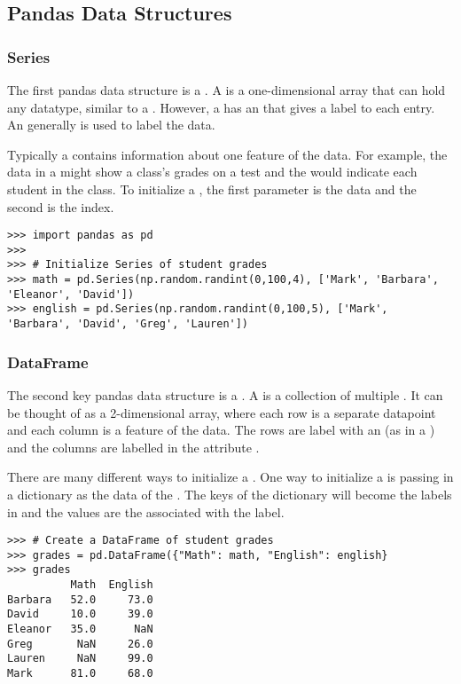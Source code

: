 \subsection*{Pandas Data Structures}

\subsubsection*{Series}

The first pandas data structure is a .
A  is a one-dimensional array that can hold any datatype, similar to a .
However, a  has an  that gives a label to each entry.
An  generally is used to label the data.

Typically a  contains information about one feature of the data.
For example, the data in a  might show a class's grades on a test and the  would indicate each student in the class.
To initialize a , the first parameter is the data and the second is the index.

\begin{lstlisting}
>>> import pandas as pd
>>>
>>> # Initialize Series of student grades
>>> math = pd.Series(np.random.randint(0,100,4), ['Mark', 'Barbara', 'Eleanor', 'David'])
>>> english = pd.Series(np.random.randint(0,100,5), ['Mark', 'Barbara', 'David', 'Greg', 'Lauren'])
\end{lstlisting}

\subsubsection*{DataFrame}

The second key pandas data structure is a .
A  is a collection of multiple .
It can be thought of as a 2-dimensional array, where each row is a separate datapoint and each column is a feature of the data.
The rows are label with an  (as in a ) and the columns are labelled in the attribute .

There are many different ways to initialize a .
One way to initialize a  is passing in a dictionary as the data of the .
The keys of the dictionary will become the labels in  and the values are the  associated with the label.

\begin{lstlisting}
>>> # Create a DataFrame of student grades
>>> grades = pd.DataFrame({"Math": math, "English": english}
>>> grades
	      Math  English
Barbara   52.0     73.0
David     10.0     39.0
Eleanor   35.0      NaN
Greg       NaN     26.0
Lauren     NaN     99.0
Mark      81.0     68.0
\end{lstlisting}

